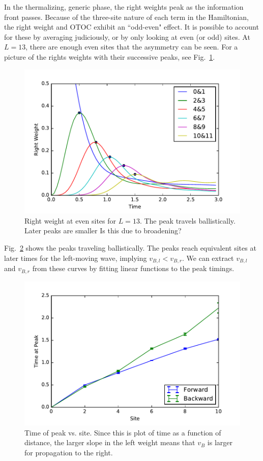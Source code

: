 \documentclass[aps,prl,reprint,superscriptaddress, longbibliography]{revtex4-1}
\newcommand{\charlie}[1]{ {\color{Magenta} {{#1}}}}
\begin{document}
In the thermalizing, generic phase, the right weights peak as the information front passes. Because of the three-site nature of each term in the Hamiltonian, the right weight and OTOC exhibit an ``odd-even" effect. It is possible to account for these by averaging judiciously, or by only looking at even (or odd) sites. At $L=13$, there are enough even sites that the asymmetry can be seen. For a picture of the rights weights with their successive peaks, see Fig.~\ref{fig:Rweightpeakshape}. 

\begin{figure}
	\includegraphics[width=\columnwidth]{Rweightpeakshape}
	\caption{Right weight at even sites for $L=13$. The peak travels ballistically. Later peaks are smaller \charlie{Is this due to broadening?}}
	\label{fig:Rweightpeakshape}
\end{figure}

Fig.~\ref{fig:Rweightpeaktimes} shows the peaks traveling ballistically. The peaks reach equivalent sites at later times for the left-moving wave, implying $v_{B,l}<v_{B,r}$. We can extract $v_{B,l}$ and $v_{B,r}$ from these curves by fitting linear functions to the peak timings.

\begin{figure}
	\includegraphics[width=\columnwidth]{Rweightpeaktimes}
	\caption{Time of peak vs. site. Since this is plot of time as a function of distance, the larger slope in the left weight means that $v_B$ is larger for propagation to the right.}
	\label{fig:Rweightpeaktimes}
\end{figure}
\end{document}
